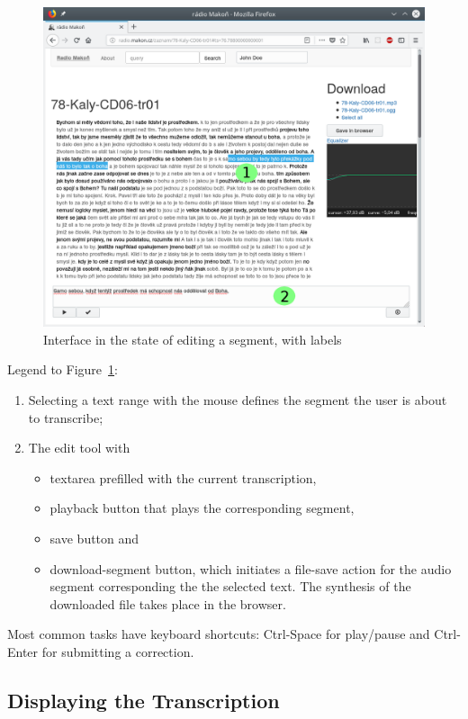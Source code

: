 \documentclass{svproc}
\begin{document}
\begin{figure}[htpb]
\includegraphics[scale=0.6]{rc/radio-makon-en-2-lab.png}
\caption{Interface in the state of editing a segment, with labels}
\label{fig:scn2lab}
\end{figure}

Legend to Figure~\ref{fig:scn2lab}:
\begin{enumerate}
\item{
    Selecting a text range with the mouse defines the segment the user is about
    to transcribe;
}
\item{
    The edit tool with
    \begin{itemize}
    \item{textarea prefilled with the current transcription,}
    \item{playback button that plays the corresponding segment,}
    \item{save button and}
    \item{download-segment button, which initiates a file-save action for the
    audio segment corresponding the the selected text. The synthesis of the
    downloaded file takes place in the browser.}
    \end{itemize}
}
\end{enumerate}

Most common tasks have keyboard shortcuts: Ctrl-Space for play/pause and
Ctrl-Enter for submitting a correction.

\subsection{Displaying the Transcription}
\end{document}
